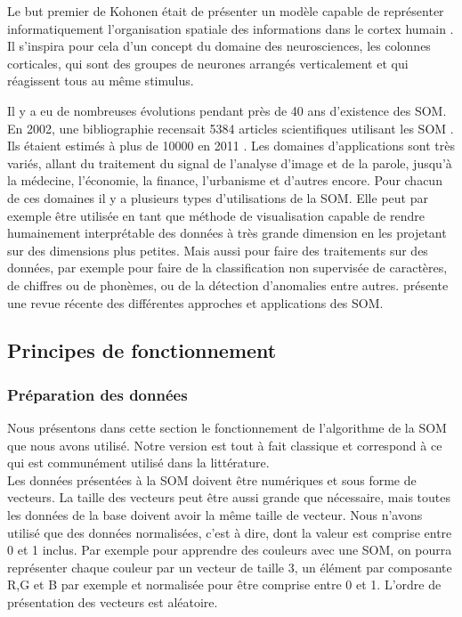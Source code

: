
	Le but premier de Kohonen était de présenter un modèle capable de représenter informatiquement l'organisation spatiale des informations dans le cortex humain \cite{kohonen-memory}. Il s'inspira pour cela d'un concept du domaine des neurosciences, les colonnes corticales, qui sont des groupes de neurones arrangés verticalement et qui réagissent tous au même stimulus.

	Il y a eu de nombreuses évolutions pendant près de 40 ans d'existence des SOM. En 2002, une bibliographie recensait 5384 articles scientifiques utilisant les SOM \cite{oja2003bibliography}. Ils étaient estimés à plus de 10000 en 2011 \cite{bilbiography-finuni}. Les domaines d'applications sont très variés, allant du traitement du signal de l'analyse d'image et de la parole, jusqu'à la médecine, l'économie, la finance, l'urbanisme et d'autres encore. Pour chacun de ces domaines il y a plusieurs types d'utilisations de la SOM. Elle peut par exemple être utilisée en tant que méthode de visualisation capable de rendre humainement interprétable des données à très grande dimension en les projetant sur des dimensions plus petites. Mais aussi pour faire des traitements sur des données, par exemple pour faire de la classification non supervisée de caractères, de chiffres ou de phonèmes, ou de la détection d'anomalies entre autres. \cite{cottrell2018self} présente une revue récente des différentes approches et applications des SOM. 

\subsection{Principes de fonctionnement}\label{sec:sota:som_fc}
\subsubsection{Préparation des données}

	Nous présentons dans cette section le fonctionnement de l'algorithme de la SOM que nous avons utilisé. Notre version est tout à fait classique et correspond à ce qui est communément utilisé dans la littérature.\\

	Les données présentées à la SOM doivent être numériques et sous forme de vecteurs. La taille des vecteurs peut être aussi grande que nécessaire, mais toutes les données de la base doivent avoir la même taille de vecteur. Nous n'avons utilisé que des données normalisées, c'est à dire, dont la valeur est comprise entre 0 et 1 inclus. Par exemple pour apprendre des couleurs avec une SOM, on pourra représenter chaque couleur par un vecteur de taille 3, un élément par composante R,G et B par exemple et normalisée pour être comprise entre 0 et 1. L'ordre de présentation des vecteurs est aléatoire.

